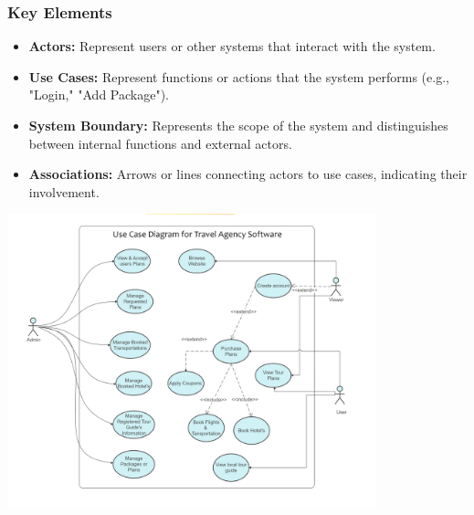 \subsubsection{Key Elements}
\begin{itemize}
    \item \textbf{Actors:} Represent users or other systems that interact with the system.
    \item \textbf{Use Cases:} Represent functions or actions that the system performs (e.g., "Login," "Add Package").
    \item \textbf{System Boundary:} Represents the scope of the system and distinguishes between internal functions and external actors.
    \item \textbf{Associations:} Arrows or lines connecting actors to use cases, indicating their involvement.
\end{itemize}

\vspace{0.5cm}
\begin{center}
\includegraphics[width=0.8\textwidth]{./figures/Use Case Diagrams/uc_1.3.png} %
\end{center}
\vspace{0.5cm}

